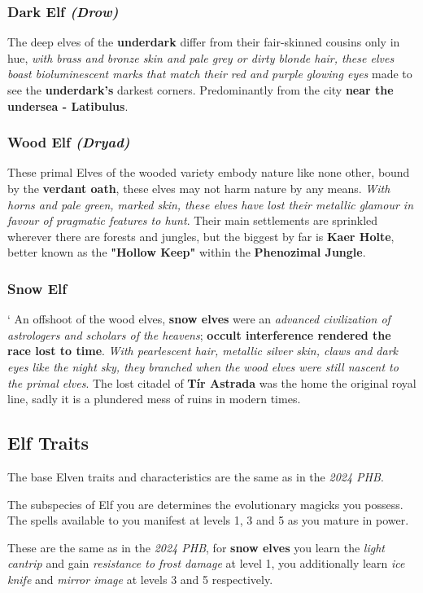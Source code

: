 \documentclass[letterpaper,twocolumn,openany,nodeprecatedcode,breakable,skins,xparse,most]{dndbook}
\begin{document}
\subsubsection{Dark Elf \textit{(Drow)}}
The deep elves of the\textbf{ underdark} differ from their fair-skinned cousins only in hue, \textit{with brass and bronze skin and pale grey or dirty blonde hair, these elves boast bioluminescent marks that match their red and purple glowing eyes} made to see the \textbf{underdark's} darkest corners. Predominantly from the city \textbf{near the undersea - Latibulus}.

\subsubsection{Wood Elf \textit{(Dryad)}}
These primal Elves of the wooded variety embody nature like none other, bound by the \textbf{verdant oath}, these elves may not harm nature by any means. \textit{With horns and pale green, marked skin, these elves have lost their metallic glamour in favour of pragmatic features to hunt}. Their main settlements are sprinkled wherever there are forests and jungles, but the biggest by far is \textbf{Kaer Holte}, better known as the \textbf{"Hollow Keep"} within the \textbf{Phenozimal Jungle}.

\subsubsection{Snow Elf}`
An offshoot of the wood elves, \textbf{snow elves} were an \textit{advanced civilization of astrologers and scholars of the heavens}; \textbf{occult interference rendered the race lost to time}. \textit{With pearlescent hair, metallic silver skin, claws and dark eyes like the night sky, they branched when the wood elves were still nascent to the primal elves}. The lost citadel of \textbf{Tír Astrada} was the home the original royal line, sadly it is a plundered mess of ruins in modern times.

\subsection{Elf Traits}
The base Elven traits and characteristics are the same as in the \textit{2024 PHB}.

The subspecies of Elf you are determines the evolutionary magicks you possess. The spells available to you manifest at levels 1, 3 and 5 as you mature in power.

These are the same as in the \textit{2024 PHB}, for \textbf{snow elves} you learn the \textit{light cantrip} and gain \textit{resistance to frost damage} at level 1, you additionally learn \textit{ice knife} and \textit{mirror image} at levels 3 and 5 respectively. 
\end{document}
